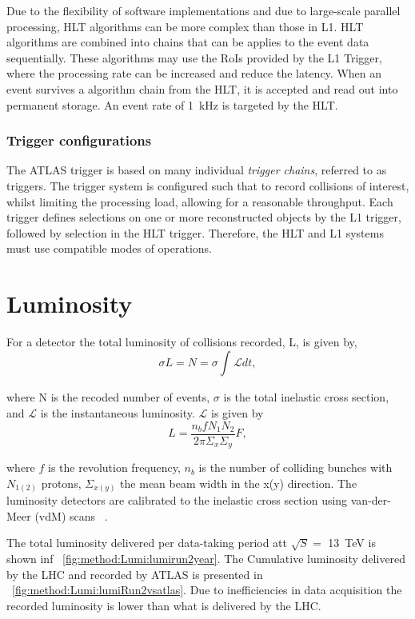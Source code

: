 Due to the flexibility of software implementations and due to large-scale parallel processing, HLT algorithms can be more complex than those in L1. HLT algorithms are combined into chains that can be applies to the event data sequentially. These algorithms may use the RoIs provided by the L1 Trigger, where the processing rate can be increased and reduce the latency. When an event survives a algorithm chain from the HLT, it is accepted and read out into permanent storage. An event rate of \SI{1}{\kilo\hertz} is targeted by the HLT.

\subsubsection{Trigger configurations}

The ATLAS trigger is based on many individual \emph{trigger chains}, referred to as triggers. The trigger system is configured such that to record collisions of interest, whilst limiting the processing load, allowing for a reasonable throughput. Each trigger defines selections on one or more reconstructed objects by the L1 trigger, followed by selection in the HLT trigger. Therefore, the HLT and L1 systems must use compatible modes of operations. 

\section{Luminosity}\label{sec:lumi}

For a detector the total luminosity of collisions recorded, L, is given by, 
\begin{equation}
   \sigma L = N = \sigma \int_{}^{} \mathcal{L} dt,
\end{equation}

where N is the recoded number of events, $\sigma$ is the total inelastic cross section, and $\mathcal{L}$ is the instantaneous luminosity. $\mathcal{L}$ is given by~\cite{Herr}
\begin{equation}
    L = \frac{n_b f N_1 N_2 }{2\pi \Sigma_{x} \Sigma_{y}} F,
\end{equation}

where $f$ is the revolution frequency, $n_b$ is the number of colliding bunches with $N_{1(2)}$ protons, $\Sigma_{x(y)}$ the mean beam width in the x(y) direction. The luminosity detectors are calibrated to the inelastic cross section using van-der-Meer (vdM) scans ~\cite{ATLAS:Balagura_2011,ATLAS:vanderMeer:296752}.

The total luminosity delivered per data-taking period att $\sqrt{S} = $ \SI{13}{\tera\electronvolt} is shown inf ~\cref{fig:method:Lumi:lumirun2year}. The Cumulative luminosity delivered by the LHC and recorded by ATLAS is presented in ~\cref{fig:method:Lumi:lumiRun2vsatlas}. Due to inefficiencies in data acquisition the recorded luminosity is lower than what is delivered by the LHC. 

